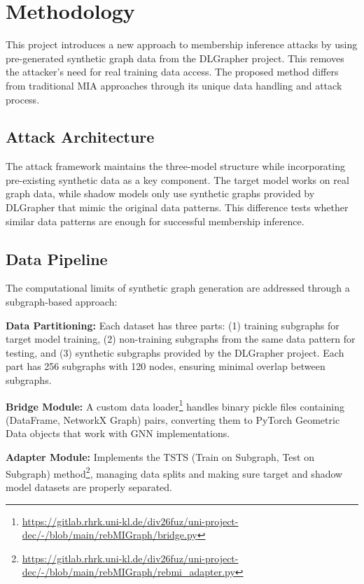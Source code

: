 \documentclass{article}
\begin{document}
\section{Methodology}
This project introduces a new approach to membership inference attacks by using pre-generated synthetic graph data from the DLGrapher project. This removes the attacker's need for real training data access. The proposed method differs from traditional MIA approaches through its unique data handling and attack process.

\subsection{Attack Architecture}
The attack framework maintains the three-model structure while incorporating pre-existing synthetic data as a key component. The target model works on real graph data, while shadow models only use synthetic graphs provided by DLGrapher that mimic the original data patterns. This difference tests whether similar data patterns are enough for successful membership inference.

\subsection{Data Pipeline}
The computational limits of synthetic graph generation are addressed through a subgraph-based approach:

\textbf{Data Partitioning:} Each dataset has three parts: (1) training subgraphs for target model training, (2) non-training subgraphs from the same data pattern for testing, and (3) synthetic subgraphs provided by the DLGrapher project. Each part has 256 subgraphs with 120 nodes, ensuring minimal overlap between subgraphs.

\textbf{Bridge Module:} A custom data loader\footnote{\url{https://gitlab.rhrk.uni-kl.de/div26fuz/uni-project-dec/-/blob/main/rebMIGraph/bridge.py}} handles binary pickle files containing (DataFrame, NetworkX Graph) pairs, converting them to PyTorch Geometric Data objects that work with GNN implementations.

\textbf{Adapter Module:} Implements the TSTS (Train on Subgraph, Test on Subgraph) method\footnote{\url{https://gitlab.rhrk.uni-kl.de/div26fuz/uni-project-dec/-/blob/main/rebMIGraph/rebmi_adapter.py}}, managing data splits and making sure target and shadow model datasets are properly separated.
\end{document}
